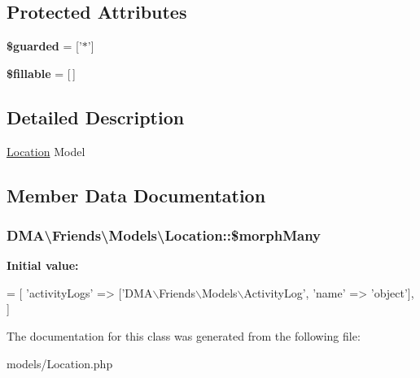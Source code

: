 \subsection*{Protected Attributes}
\begin{DoxyCompactItemize}
\item 
\hypertarget{classDMA_1_1Friends_1_1Models_1_1Location_a248021f938f61b3ccce7e20b259e39e9}{{\bfseries \$guarded} = \mbox{[}'$\ast$'\mbox{]}}\label{classDMA_1_1Friends_1_1Models_1_1Location_a248021f938f61b3ccce7e20b259e39e9}

\item 
\hypertarget{classDMA_1_1Friends_1_1Models_1_1Location_aaa75ba74c2a24c4e42b109b0b2c82ca0}{{\bfseries \$fillable} = \mbox{[}$\,$\mbox{]}}\label{classDMA_1_1Friends_1_1Models_1_1Location_aaa75ba74c2a24c4e42b109b0b2c82ca0}

\end{DoxyCompactItemize}


\subsection{Detailed Description}
\hyperlink{classDMA_1_1Friends_1_1Models_1_1Location}{Location} Model 

\subsection{Member Data Documentation}
\hypertarget{classDMA_1_1Friends_1_1Models_1_1Location_a94915d02afa4db52780159b84d9ce12e}{
\subsubsection[{\$morph\+Many}]{\setlength{\rightskip}{0pt plus 5cm}D\+M\+A\textbackslash{}\+Friends\textbackslash{}\+Models\textbackslash{}\+Location\+::\$morph\+Many}}\label{classDMA_1_1Friends_1_1Models_1_1Location_a94915d02afa4db52780159b84d9ce12e}
{\bfseries Initial value\+:}
\begin{DoxyCode}
= [ 
        \textcolor{stringliteral}{'activityLogs'}  => [\textcolor{stringliteral}{'DMA\(\backslash\)Friends\(\backslash\)Models\(\backslash\)ActivityLog'}, \textcolor{stringliteral}{'name'} => \textcolor{stringliteral}{'object'}],
    ]
\end{DoxyCode}


The documentation for this class was generated from the following file\+:\begin{DoxyCompactItemize}
\item 
models/Location.\+php\end{DoxyCompactItemize}
